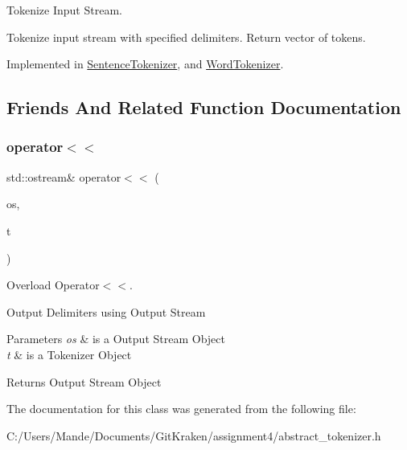 Tokenize Input Stream. 

Tokenize input stream with specified delimiters. Return vector of tokens. 

Implemented in \hyperlink{class_sentence_tokenizer_a43c1d3f33855c3e5c80cab538cea9224}{Sentence\+Tokenizer}, and \hyperlink{class_word_tokenizer_a1148e1e01de56a7529a39a81a712e04c}{Word\+Tokenizer}.



\subsection{Friends And Related Function Documentation}
\mbox{\label{class_abstract_tokenizer_a5e19d812ca20914a070862e6336c1432}} 
\subsubsection{\texorpdfstring{operator$<$$<$}{operator<<}}
{\footnotesize\ttfamily std\+::ostream\& operator$<$$<$ (\begin{DoxyParamCaption}\item[{std\+::ostream \&}]{os,  }\item[{const \hyperlink{class_abstract_tokenizer}{Abstract\+Tokenizer} \&}]{t }\end{DoxyParamCaption})\hspace{0.3cm}{\ttfamily [friend]}}



Overload Operator$<$$<$. 

Output Delimiters using Output Stream


\begin{DoxyParams}{Parameters}
{\em os} & is a Output Stream Object \\
\hline
{\em t} & is a Tokenizer Object \\
\hline
\end{DoxyParams}
\begin{DoxyReturn}{Returns}
Output Stream Object 
\end{DoxyReturn}


The documentation for this class was generated from the following file\+:\begin{DoxyCompactItemize}
\item 
C\+:/\+Users/\+Mande/\+Documents/\+Git\+Kraken/assignment4/abstract\+\_\+tokenizer.\+h\end{DoxyCompactItemize}
